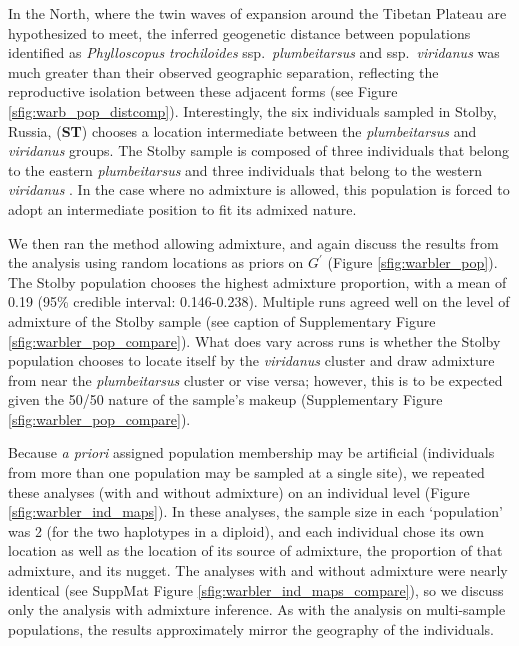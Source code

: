 \documentclass[12pt]{article}
\begin{document}
In the North, where the twin waves of expansion around the Tibetan Plateau are hypothesized to meet, the inferred geogenetic distance between populations identified as \textit{Phylloscopus trochiloides} ssp.\ \textit{plumbeitarsus} and ssp.\ \textit{viridanus} was much greater than their observed geographic separation, reflecting the reproductive isolation between these adjacent forms (see Figure \ref{sfig:warb_pop_distcomp}).  Interestingly, the six individuals sampled in Stolby, Russia, (\textbf{ST}) chooses a location intermediate between the \textit{plumbeitarsus} and \textit{viridanus} groups. The Stolby sample is composed of three individuals that belong to the eastern \textit{plumbeitarsus} and three individuals that belong to the western \textit{viridanus} \citep{alcaide2014genomic}. In the case where no admixture is allowed, this population is forced to adopt an intermediate position to fit its admixed nature.


We then ran the method allowing admixture, and again discuss the results from the analysis using random locations as priors on $G^{\prime}$ (Figure \ref{sfig:warbler_pop}). The Stolby population chooses the highest admixture proportion, with a mean of 0.19 (95\% credible interval: 0.146-0.238).  Multiple runs agreed well on the level of admixture of the Stolby sample (see caption of Supplementary Figure \ref{sfig:warbler_pop_compare}). What does vary across runs is whether the Stolby population chooses to locate itself by the \textit{viridanus} cluster and draw admixture from near the \textit{plumbeitarsus}  cluster or vise versa; however, this is to be expected given the 50/50 nature of the sample's makeup (Supplementary Figure \ref{sfig:warbler_pop_compare}).

Because \textit{a priori} assigned population membership may be artificial (individuals from more than one population may be sampled at a single site), we repeated these analyses (with and without admixture) on an individual level (Figure \ref{sfig:warbler_ind_maps}).  In these analyses, the sample size in each `population' was 2 (for the two haplotypes in a diploid), and each individual chose its own location as well as the location of its source of admixture, the proportion of that admixture, and its nugget.  
The analyses with and without admixture were nearly identical (see SuppMat Figure \ref{sfig:warbler_ind_maps_compare}), so 
we discuss only the analysis with admixture inference.  As with the analysis on multi-sample populations, the results approximately mirror the geography of the individuals.
\end{document}
